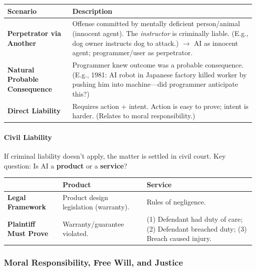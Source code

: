 \begin{center}
\renewcommand{\arraystretch}{1.3}
\begin{tabular}{@{} l p{9cm} @{}}
\toprule
\textbf{Scenario} & \textbf{Description} \\
\midrule
\textbf{Perpetrator via Another} & Offense committed by mentally deficient person/animal (innocent agent). The \textit{instructor} is criminally liable. (E.g., dog owner instructs dog to attack.) $\to$ AI as innocent agent; programmer/user as perpetrator. \\
\textbf{Natural Probable Consequence} & Programmer knew outcome was a probable consequence. (E.g., 1981: AI robot in Japanese factory killed worker by pushing him into machine---did programmer anticipate this?) \\
\textbf{Direct Liability} & Requires action + intent. Action is easy to prove; intent is harder. (Relates to moral responsibility.) \\
\bottomrule
\end{tabular}
\end{center}

\paragraph*{Civil Liability}

If criminal liability doesn't apply, the matter is settled in civil court. Key question: Is AI a \textbf{product} or a \textbf{service}?

\begin{center}
\renewcommand{\arraystretch}{1.3}
\begin{tabular}{@{} l p{5cm} p{5cm} @{}}
\toprule
& \textbf{Product} & \textbf{Service} \\
\midrule
\textbf{Legal Framework} & Product design legislation (warranty). & Rules of negligence. \\
\textbf{Plaintiff Must Prove} & Warranty/guarantee violated. & (1) Defendant had duty of care; (2) Defendant breached duty; (3) Breach caused injury. \\
\bottomrule
\end{tabular}
\end{center}

\separator

\subsubsection{Moral Responsibility, Free Will, and Justice}

